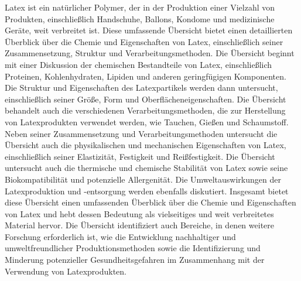 Latex ist ein natürlicher Polymer, der in der Produktion einer Vielzahl von Produkten, einschließlich Handschuhe, Ballons, Kondome und medizinische Geräte, weit verbreitet ist.
Diese umfassende Übersicht bietet einen detaillierten Überblick über die Chemie und Eigenschaften von Latex, einschließlich seiner Zusammensetzung, Struktur und Verarbeitungsmethoden.
Die Übersicht beginnt mit einer Diskussion der chemischen Bestandteile von Latex, einschließlich Proteinen, Kohlenhydraten, Lipiden und anderen geringfügigen Komponenten.
Die Struktur und Eigenschaften des Latexpartikels werden dann untersucht, einschließlich seiner Größe, Form und Oberflächeneigenschaften.
Die Übersicht behandelt auch die verschiedenen Verarbeitungsmethoden, die zur Herstellung von Latexprodukten verwendet werden, wie Tauchen, Gießen und Schaumstoff.
Neben seiner Zusammensetzung und Verarbeitungsmethoden untersucht die Übersicht auch die physikalischen und mechanischen Eigenschaften von Latex, einschließlich seiner Elastizität, Festigkeit und Reißfestigkeit.
Die Übersicht untersucht auch die thermische und chemische Stabilität von Latex sowie seine Biokompatibilität und potenzielle Allergenität.
Die Umweltauswirkungen der Latexproduktion und -entsorgung werden ebenfalls diskutiert.
Insgesamt bietet diese Übersicht einen umfassenden Überblick über die Chemie und Eigenschaften von Latex und hebt dessen Bedeutung als vielseitiges und weit verbreitetes Material hervor.
Die Übersicht identifiziert auch Bereiche, in denen weitere Forschung erforderlich ist, wie die Entwicklung nachhaltiger und umweltfreundlicher Produktionsmethoden sowie die Identifizierung und Minderung potenzieller Gesundheitsgefahren im Zusammenhang mit der Verwendung von Latexprodukten.



\vfill

